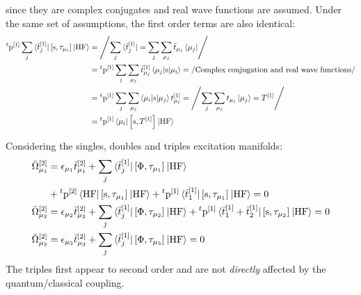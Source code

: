 since they are complex conjugates and real wave functions are assumed.
Under the same set of assumptions, the first order terms are also identical:
\begin{equation}
  \begin{aligned}
  {}^t\mathrm{p}^{[1]} \sum_j\braket{\bar{t}_{j}^{[1]} | \left[ \mathrm{s}, \tau_{\mu_i} \right]^{} | \mathrm{HF}}
  &= \left/ \sum_j\bra{\bar{t}_{j}^{[1]}} = \sum_j\sum_{\mu_j}\bar{t}_{\mu_j}\bra{\mu_j}  \right/ \\
  &=
  {}^t\mathrm{p}^{[1]} \sum_j\sum_{\mu_j}\bar{t}_{\mu_j}^{[1]} \braket{\mu_j| \mathrm{s} | \mu_i}
  = \left/ \text{Complex conjugation and real wave functions} \right/ \\
  &=
  {}^t\mathrm{p}^{[1]} \sum_j\sum_{\mu_j} \braket{\mu_i| \mathrm{s} | \mu_j} t_{\mu_j}^{[1]}
  = \left/ \sum_j\sum_{\mu_j}t_{\mu_j}\ket{\mu_j}  = T^{[1]}\right/ \\
  &=
  {}^t\mathrm{p}^{[1]}\braket{\mu_i | \left[ \mathrm{s}, T^{[1]} \right]^{} | \mathrm{HF}}
 \end{aligned}
\end{equation}

Considering the singles, doubles and triples excitation manifolds:
\begin{subequations}
  \begin{align}
    \bar{\Omega}_{\mu_1}^{[2]} &=
      \epsilon_{\mu_1}\bar{t}_{\mu_1}^{[2]}
      + \sum_j\braket{\bar{t}_{j}^{[1]} |
      \left[ \Phi, \tau_{\mu_1} \right]^{} | \mathrm{HF}} \nonumber \\
      &+ {}^t\mathrm{p}^{[2]}\braket{\mathrm{HF} |
      \left[ \mathrm{s}, \tau_{\mu_1} \right]^{} | \mathrm{HF}}
      + {}^t\mathrm{p}^{[1]}
      \braket{\bar{t}_{1}^{[1]} |
      \left[ \mathrm{s}, \tau_{\mu_1} \right]^{} | \mathrm{HF}}
      =0 \\
    \bar{\Omega}_{\mu_2}^{[2]} &=
      \epsilon_{\mu_2}\bar{t}_{\mu_2}^{[2]}
      + \sum_j\braket{\bar{t}_{j}^{[1]} |
      \left[ \Phi, \tau_{\mu_2} \right]^{} | \mathrm{HF}}
      + {}^t\mathrm{p}^{[1]}
      \braket{\bar{t}_{1}^{[1]} + \bar{t}_{2}^{[1]} |
      \left[ \mathrm{s}, \tau_{\mu_2} \right]^{} | \mathrm{HF}}
      =0 \\
    \bar{\Omega}_{\mu_3}^{[2]} &=
      \epsilon_{\mu_3}\bar{t}_{\mu_3}^{[2]}
      + \sum_j\braket{\bar{t}_{j}^{[1]} |
      \left[ \Phi, \tau_{\mu_3} \right]^{} | \mathrm{HF}}
      =0
  \end{align}
\end{subequations}
The triples first appear to second order and are not \emph{directly}
affected by the quantum/classical coupling.

